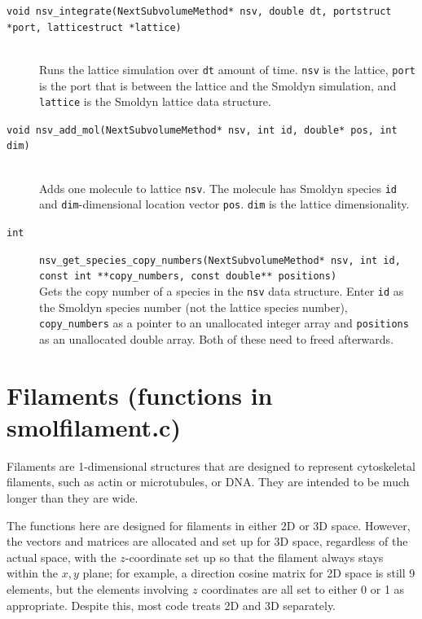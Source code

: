 \documentclass {scrbook}
\newcommand {\ttt} {\texttt}
\begin{document}
\begin{description}
\item[\ttt{void nsv\_integrate(NextSubvolumeMethod* nsv, double dt, portstruct *port, latticestruct *lattice)}]
\hfill \\
Runs the lattice simulation over \ttt{dt} amount of time. \ttt{nsv} is the lattice, \ttt{port} is the port that is between the lattice and the Smoldyn simulation, and \ttt{lattice} is the Smoldyn lattice data structure.

\item[\ttt{void nsv\_add\_mol(NextSubvolumeMethod* nsv, int id, double* pos, int dim)}]
\hfill \\
Adds one molecule to lattice \ttt{nsv}. The molecule has Smoldyn species \ttt{id} and \ttt{dim}-dimensional location vector \ttt{pos}. \ttt{dim} is the lattice dimensionality.

\item[\ttt{int}]
\ttt{nsv\_get\_species\_copy\_numbers(NextSubvolumeMethod* nsv, int id, const int **copy\_numbers, const double** positions)}
\hfill \\
Gets the copy number of a species in the \ttt{nsv} data structure. Enter \ttt{id} as the Smoldyn species number (not the lattice species number), \ttt{copy\_numbers} as a pointer to an unallocated integer array and \ttt{positions} as an unallocated double array. Both of these need to freed afterwards.

\end{description}

\section{Filaments (functions in smolfilament.c)}

Filaments are 1-dimensional structures that are designed to represent cytoskeletal filaments, such as actin or microtubules, or DNA. They are intended to be much longer than they are wide.

The functions here are designed for filaments in either 2D or 3D space. However, the vectors and matrices are allocated and set up for 3D space, regardless of the actual space, with the $z$-coordinate set up so that the filament always stays within the $x,y$ plane; for example, a direction cosine matrix for 2D space is still 9 elements, but the elements involving $z$ coordinates are all set to either 0 or 1 as appropriate. Despite this, most code treats 2D and 3D separately.
\end{document}
